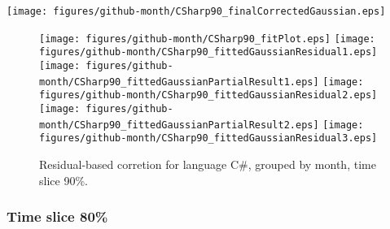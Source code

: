 \begin{center}
{\texttt{[image: figures/github-month/CSharp90\_finalCorrectedGaussian.eps]}}
\end{center}

\FloatBarrier

\begin{figure}[t]
\centering
{}
{\texttt{[image: figures/github-month/CSharp90\_fitPlot.eps]}}
{\texttt{[image: figures/github-month/CSharp90\_fittedGaussianResidual1.eps]}}
{\texttt{[image: figures/github-month/CSharp90\_fittedGaussianPartialResult1.eps]}}
{\texttt{[image: figures/github-month/CSharp90\_fittedGaussianResidual2.eps]}}
{\texttt{[image: figures/github-month/CSharp90\_fittedGaussianPartialResult2.eps]}}
{\texttt{[image: figures/github-month/CSharp90\_fittedGaussianResidual3.eps]}}
\caption{Residual-based corretion for language C\#, grouped by month, time slice 90\%.}
\end{figure}


\FloatBarrier


\subsubsection{Time slice 80\%}

